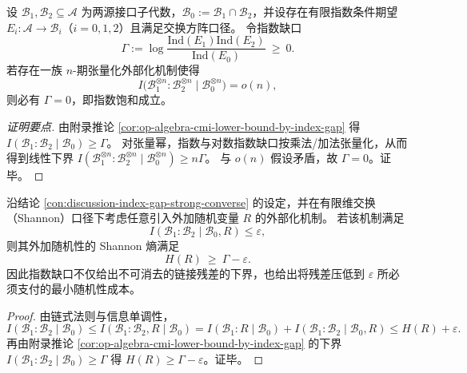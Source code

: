 \begin{proposition}\label{con:discussion-index-gap-strong-converse}
设 \(\mathcal{B}_1,\mathcal{B}_2\subseteq\mathcal{A}\) 为两源接口子代数，\(\mathcal{B}_0:=\mathcal{B}_1\cap\mathcal{B}_2\)，并设存在有限指数条件期望 \(E_i:\mathcal{A}\to\mathcal{B}_i\)（\(i=0,1,2\)）且满足交换方阵口径。
令指数缺口
\[
\Gamma:=\log\frac{\mathrm{Ind}(E_1)\mathrm{Ind}(E_2)}{\mathrm{Ind}(E_0)}\ \ge\ 0.
\]
若存在一族 \(n\)-期张量化外部化机制使得
\[
I\bigl(\mathcal{B}_1^{\otimes n}:\mathcal{B}_2^{\otimes n}\mid\mathcal{B}_0^{\otimes n}\bigr)=o(n),
\]
则必有 \(\Gamma=0\)，即指数饱和成立。
\end{proposition}
\begin{proof}[证明要点]
由附录推论 \ref{cor:op-algebra-cmi-lower-bound-by-index-gap} 得
\(
I(\mathcal{B}_1:\mathcal{B}_2\mid\mathcal{B}_0)\ge \Gamma
\)。
对张量幂，指数与对数指数缺口按乘法/加法张量化，从而得到线性下界
\(
I(\mathcal{B}_1^{\otimes n}:\mathcal{B}_2^{\otimes n}\mid\mathcal{B}_0^{\otimes n})\ge n\Gamma
\)。
与 \(o(n)\) 假设矛盾，故 \(\Gamma=0\)。证毕。
\end{proof}

\begin{proposition}\label{con:discussion-randomness-cost-lower-bound}
沿结论 \ref{con:discussion-index-gap-strong-converse} 的设定，并在有限维交换（Shannon）口径下考虑任意引入外加随机变量 \(R\) 的外部化机制。
若该机制满足
\[
I(\mathcal{B}_1:\mathcal{B}_2\mid\mathcal{B}_0,R)\le \varepsilon,
\]
则其外加随机性的 Shannon 熵满足
\[
\boxed{\;H(R)\ \ge\ \Gamma-\varepsilon.\;}
\]
因此指数缺口不仅给出不可消去的链接残差的下界，也给出将残差压低到 \(\varepsilon\) 所必须支付的最小随机性成本。
\end{proposition}
\begin{proof}
由链式法则与信息单调性，
\[
I(\mathcal{B}_1:\mathcal{B}_2\mid\mathcal{B}_0)
\le I(\mathcal{B}_1:\mathcal{B}_2,R\mid\mathcal{B}_0)
=I(\mathcal{B}_1:R\mid\mathcal{B}_0)+I(\mathcal{B}_1:\mathcal{B}_2\mid\mathcal{B}_0,R)
\le H(R)+\varepsilon.
\]
再由附录推论 \ref{cor:op-algebra-cmi-lower-bound-by-index-gap} 的下界
\(
I(\mathcal{B}_1:\mathcal{B}_2\mid\mathcal{B}_0)\ge \Gamma
\)
得 \(H(R)\ge \Gamma-\varepsilon\)。证毕。
\end{proof}

